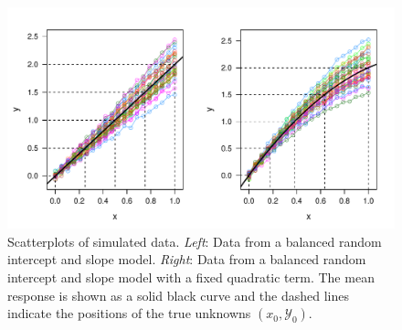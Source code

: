 \documentclass[cmfont,usenames,dvipsnames,leqno]{afit-etd}\usepackage[]{graphicx}\usepackage[]{color}
\makeatletter
\def\maxwidth{ %
  \ifdim\Gin@nat@width>\linewidth
    \linewidth
  \else
    \Gin@nat@width
  \fi
}
\newenvironment{knitrout}{}{} %
\renewenvironment{knitrout}{\begin{singlespace}}{\end{singlespace}}
\newcommand{\mc}[1]{\ensuremath{\mathcal{#1}}}
\makeatother
\begin{document}
\begin{knitrout}
\color{fgcolor}\begin{figure}[!ht]

\includegraphics[width=\maxwidth]{figure/simdata-scatterplots} \caption[Scatterplots of simulated data]{Scatterplots of simulated data. \textit{Left}: Data from a balanced random intercept and slope model. \textit{Right}: Data from a balanced random intercept and slope model with a fixed quadratic term. The mean response is shown as a solid black curve and the dashed lines indicate the positions of the true unknowns $\left(x_0, \mc{Y}_0\right).$\label{fig:simdata-scatterplots}}
\end{figure}


\end{knitrout}
\end{document}
